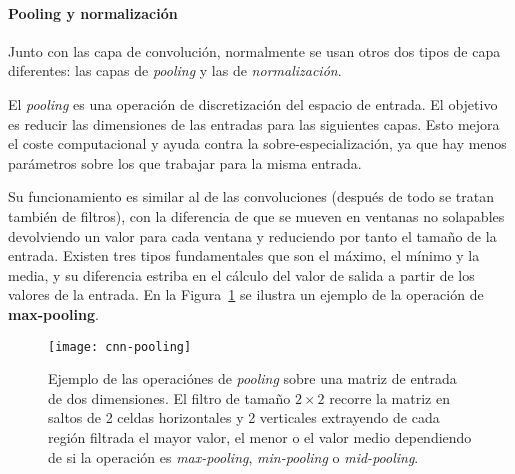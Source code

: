 \paragraph{Pooling y normalización}

Junto con las capa de convolución, normalmente se usan otros dos tipos de capa diferentes: las capas de \textit{pooling} y las de \textit{normalización}.

El \textit{pooling} es una operación de discretización del espacio de entrada. El objetivo es reducir las dimensiones de las entradas para las siguientes capas. Esto mejora el coste computacional y ayuda contra la sobre-especialización, ya que hay menos parámetros sobre los que trabajar para la misma entrada.

Su funcionamiento es similar al de las convoluciones (después de todo se tratan también de filtros), con la diferencia de que se mueven en ventanas no solapables devolviendo un valor para cada ventana y reduciendo por tanto el tamaño de la entrada. Existen tres tipos fundamentales que son el máximo, el mínimo y la media, y su diferencia estriba en el cálculo del valor de salida a partir de los valores de la entrada. En la Figura~\ref{fig:cnn-max-pooling} se ilustra un ejemplo de la operación de \textbf{max-pooling}.

\begin{figure}[t]
	\centering
	\texttt{[image: cnn-pooling]}
	\caption[Diferentes operaciónes de \textit{pooling}]{Ejemplo de las operaciónes de \textit{pooling} sobre una matriz de entrada de dos dimensiones. El filtro de tamaño $2 \times 2$ recorre la matriz en saltos de 2 celdas horizontales y 2 verticales extrayendo de cada región filtrada el mayor valor, el menor o el valor medio dependiendo de si la operación es \textit{max-pooling}, \textit{min-pooling} o \textit{mid-pooling}.}
	\label{fig:cnn-max-pooling}
\end{figure}

